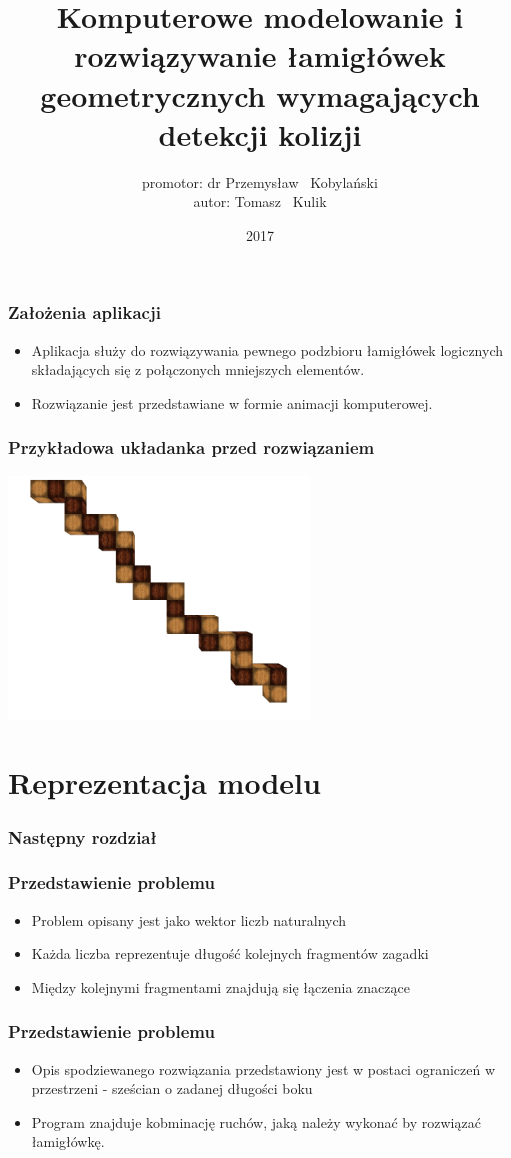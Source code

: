 \documentclass{beamer}
\title[]
{Komputerowe modelowanie i rozwiązywanie łamigłówek geometrycznych wymagających detekcji kolizji}
\author[]
{
    promotor: dr Przemysław ~Kobylański\\
    autor: Tomasz ~Kulik
}
\institute[Politechnika Wrocławska]
{
  Wydział Podstawowych Problemów Techniki\\
  Politechnika Wrocławska\\
  Polska
}
\date[2017]
{2017}
\begin{document}
    \begin{frame}
        \titlepage
    \end{frame}
    \begin{frame}
    	\frametitle{Założenia aplikacji}
        \begin{itemize}
            \item Aplikacja służy do rozwiązywania pewnego podzbioru łamigłówek logicznych składających się z 					połączonych mniejszych elementów.
            \item Rozwiązanie jest przedstawiane w formie animacji komputerowej.
        \end{itemize}
    \end{frame}
    \begin{frame}
    	\frametitle{Przykładowa układanka przed rozwiązaniem}
   		\centering
   		\includegraphics[width=0.6\textwidth]{play.png}
    \end{frame}

    \section{Reprezentacja modelu}
    \begin{frame}
    	\frametitle{Następny rozdział}
        \tableofcontents[currentsection]
    \end{frame}
    \begin{frame}
    	\frametitle{Przedstawienie problemu}
        \begin{itemize}
            \item Problem opisany jest jako wektor liczb naturalnych
            \item Każda liczba reprezentuje długość kolejnych fragmentów zagadki
            \item Między kolejnymi fragmentami znajdują się łączenia znaczące
        \end{itemize}
    \end{frame}
    \begin{frame}
    	\frametitle{Przedstawienie problemu}
        \begin{itemize}
            \item Opis spodziewanego rozwiązania przedstawiony jest w postaci ograniczeń w przestrzeni - 						sześcian o zadanej długości boku
            \item Program znajduje kobminację ruchów, jaką należy wykonać by rozwiązać łamigłówkę.
        \end{itemize}
    \end{frame}
\end{document}
